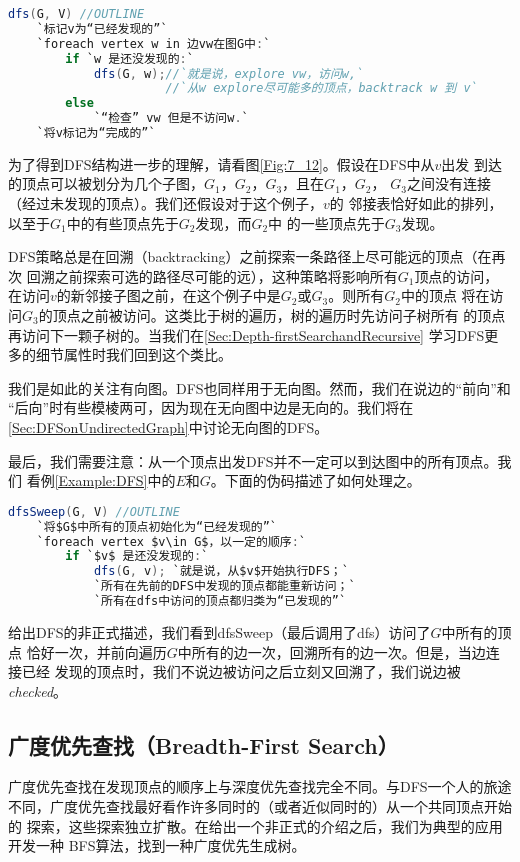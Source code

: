 \begin{lstlisting}[language={Java},keywordstyle=\color{blue!70}, commentstyle=\color{red!50!green!50!blue!50}]
dfs(G, V) //OUTLINE
    `标记v为“已经发现的”`
    `foreach vertex w in 边vw在图G中:`
        if `w 是还没发现的:`
            dfs(G, w);//`就是说，explore vw，访问w,`
                      //`从w explore尽可能多的顶点，backtrack w 到 v`
        else
            `“检查” vw 但是不访问w.`
    `将v标记为“完成的”`
\end{lstlisting}

为了得到DFS结构进一步的理解，请看图\ref{Fig:7_12}。假设在DFS中从$v$出发
到达的顶点可以被划分为几个子图，$G_1$，$G_2$，$G_3$，且在$G_1$，$G_2$，
$G_3$之间没有连接（经过未发现的顶点）。我们还假设对于这个例子，$v$的
邻接表恰好如此的排列，以至于$G_1$中的有些顶点先于$G_2$发现，而$G_2$中
的一些顶点先于$G_3$发现。

DFS策略总是在回溯（backtracking）之前探索一条路径上尽可能远的顶点（在再次
回溯之前探索可选的路径尽可能的远），这种策略将影响所有$G_1$顶点的访问，
在访问$v$的新邻接子图之前，在这个例子中是$G_2$或$G_3$。则所有$G_2$中的顶点
将在访问$G_3$的顶点之前被访问。这类比于树的遍历，树的遍历时先访问子树所有
的顶点再访问下一颗子树的。当我们在\ref{Sec:Depth-firstSearchandRecursive}
学习DFS更多的细节属性时我们回到这个类比。

我们是如此的关注有向图。DFS也同样用于无向图。然而，我们在说边的“前向”和
“后向”时有些模棱两可，因为现在无向图中边是无向的。我们将在
\ref{Sec:DFSonUndirectedGraph}中讨论无向图的DFS。

最后，我们需要注意：从一个顶点出发DFS并不一定可以到达图中的所有顶点。我们
看例\ref{Example:DFS}中的$E$和$G$。下面的伪码描述了如何处理之。
\begin{lstlisting}[language={Java},keywordstyle=\color{blue!70}, commentstyle=\color{red!50!green!50!blue!50}]
dfsSweep(G, V) //OUTLINE
    `将$G$中所有的顶点初始化为“已经发现的”`
    `foreach vertex $v\in G$，以一定的顺序:`
        if `$v$ 是还没发现的:`
            dfs(G, v); `就是说，从$v$开始执行DFS；`
            `所有在先前的DFS中发现的顶点都能重新访问；`
            `所有在dfs中访问的顶点都归类为“已发现的”`
\end{lstlisting}
给出DFS的非正式描述，我们看到dfsSweep（最后调用了dfs）访问了$G$中所有的顶点
恰好一次，并前向遍历$G$中所有的边一次，回溯所有的边一次。但是，当边连接已经
发现的顶点时，我们不说边被访问之后立刻又回溯了，我们说边被\emph{checked}。

\subsection{广度优先查找（Breadth-First Search）}
广度优先查找在发现顶点的顺序上与深度优先查找完全不同。与DFS一个人的旅途
不同，广度优先查找最好看作许多同时的（或者近似同时的）从一个共同顶点开始的
探索，这些探索独立扩散。在给出一个非正式的介绍之后，我们为典型的应用开发一种
BFS算法，找到一种广度优先生成树。

